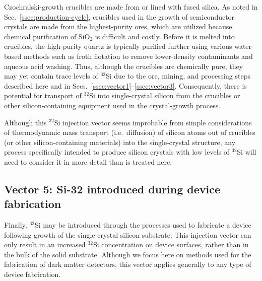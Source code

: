 \documentclass[final,5p]{elsarticle}
\def\si{$^{32}$Si\xspace}
\begin{document}
Czochralski-growth crucibles are made from or lined with fused silica. As noted in Sec.\ \ref{ssec:production-cycle}, crucibles used in the growth of semiconductor crystals are made from the highest-purity ores, which are utilized because chemical purification of SiO$_2$ is difficult and costly. Before it is melted into crucibles, the high-purity quartz is typically purified further using various water-based methods such as froth flotation to remove lower-density contaminants and aqueous acid washing. 
Thus, although the crucibles are chemically pure, they may yet contain trace levels of \si due to the ore, mining, and processing steps described here and in Secs.\ \ref{ssec:vector1}--\ref{ssec:vector3}. Consequently, there is potential for transport of \si into single-crystal silicon from the crucibles or other silicon-containing equipment used in the crystal-growth process. 

Although this \si injection vector seems improbable from simple considerations of thermodynamic mass transport (i.e.\ diffusion) of silicon atoms out of crucibles (or other silicon-containing materials) into the single-crystal structure, any process specifically intended to produce silicon crystals with low levels of \si will need to consider it in more detail than is treated here. %

\subsection{Vector 5: Si-32 introduced during device fabrication}\label{ssec:vector5}
Finally, \si may be introduced through the processes used to fabricate a device following growth of the single-crystal silicon substrate. This injection vector can only result in an increased \si concentration on device surfaces, rather than in the bulk of the solid substrate. Although we focus here on methods used for the fabrication of dark matter detectors, this vector applies generally to any type of device fabrication.
\end{document}
